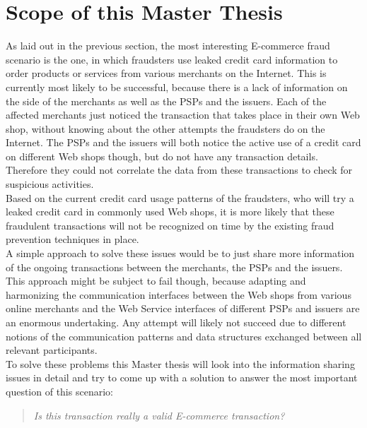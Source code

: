 
\section{Scope of this Master Thesis}
\label{sec:scope_thesis}

As laid out in the previous section, the most interesting \gls{E-commerce} fraud scenario is the one, in which fraudsters use leaked credit card information to order products or services from various merchants on the Internet. This is currently most likely to be successful, because there is a lack of information on the side of the merchants as well as the \gls{PSP}s and the issuers. Each of the affected merchants just noticed the transaction that takes place in their own Web shop, without knowing about the other attempts the fraudsters do on the Internet. The \gls{PSP}s and the issuers will both notice the active use of a credit card on different Web shops though, but do not have any transaction details. Therefore they could not correlate the data from these transactions to check for suspicious activities. \\

Based on the current credit card usage patterns of the fraudsters, who will try a leaked credit card in commonly used Web shops, it is more likely that these fraudulent transactions will not be recognized on time by the existing fraud prevention techniques in place. \\

A simple approach to solve these issues would be to just share more information of the ongoing transactions between the merchants, the \gls{PSP}s and the issuers. This approach might be subject to fail though, because adapting and harmonizing the communication interfaces between the Web shops from various online merchants and the Web Service interfaces of different \gls{PSP}s and issuers are an enormous undertaking. Any attempt will likely not succeed due to different notions of the communication patterns and data structures exchanged between all relevant participants. \\

To solve these problems this Master thesis will look into the information sharing issues in detail and try to come up with a solution to answer the most important question of this scenario: \@

\begin{quotation}
  \textit{Is this transaction really a valid \gls{E-commerce} transaction?}
\end{quotation}

